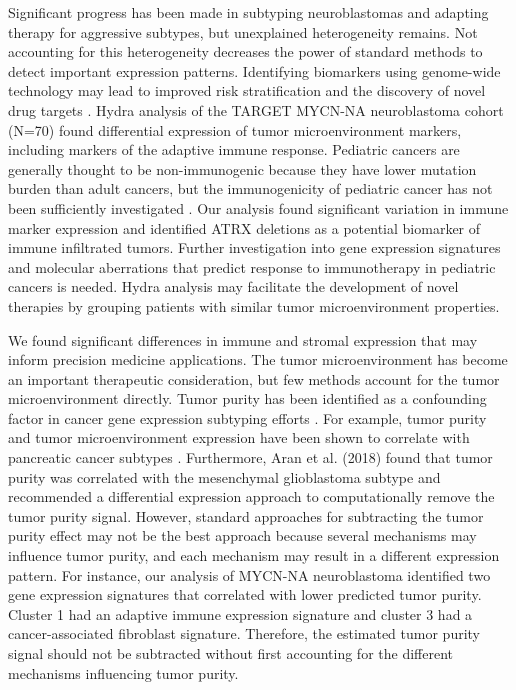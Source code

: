 \documentclass[10pt,letterpaper]{article}
\begin{document}
Significant progress has been made in subtyping neuroblastomas and adapting therapy for aggressive subtypes, but unexplained heterogeneity remains. Not accounting for this heterogeneity decreases the power of standard methods to detect important expression patterns. Identifying biomarkers using genome-wide technology may lead to improved risk stratification and the discovery of novel drug targets \cite{morgenstern2019challenge}. Hydra analysis of the TARGET MYCN-NA neuroblastoma cohort (N=70) found differential expression of tumor microenvironment markers, including markers of the adaptive immune response. Pediatric cancers are generally thought to be non-immunogenic because they have lower mutation burden than adult cancers, but the immunogenicity of pediatric cancer has not been sufficiently investigated \cite{majzner2017harnessing}. Our analysis found significant variation in immune marker expression and identified ATRX deletions as a potential biomarker of immune infiltrated tumors. Further investigation into gene expression signatures and molecular aberrations that predict response to immunotherapy in pediatric cancers is needed. Hydra analysis may facilitate the development of novel therapies by grouping patients with similar tumor microenvironment properties.

We found significant differences in immune and stromal expression that may inform precision medicine applications. The tumor microenvironment has become an important therapeutic consideration, but few methods account for the tumor microenvironment directly. Tumor purity has been identified as a confounding factor in cancer gene expression subtyping efforts \cite{rheeImpactTumorPurity2018}. For example, tumor purity and tumor microenvironment expression have been shown to correlate with pancreatic cancer subtypes \cite{raphael2017integrated}. Furthermore, Aran et al. (2018) found that tumor purity was correlated with the mesenchymal glioblastoma subtype and recommended a differential expression approach to computationally remove the tumor purity signal. However, standard approaches for subtracting the tumor purity effect may not be the best approach because several mechanisms may influence tumor purity, and each mechanism may result in a different expression pattern. For instance, our analysis of MYCN-NA neuroblastoma identified two gene expression signatures that correlated with lower predicted tumor purity. Cluster 1 had an adaptive immune expression signature and cluster 3 had a cancer-associated fibroblast signature. Therefore, the estimated tumor purity signal should not be subtracted without first accounting for the different mechanisms influencing tumor purity.
\end{document}
